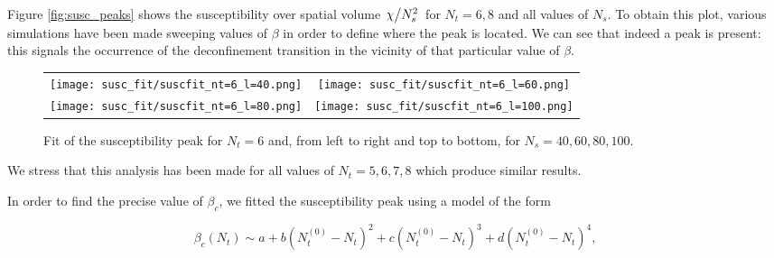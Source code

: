 \documentclass[reqno,12pt]{article}
\numberwithin{equation}{section}
\begin{document}

Figure \ref{fig:susc_peaks} shows the susceptibility over spatial volume 
$\flatfrac{\chi}{N_s^2}$ for $N_t = 6, 8$ and all values of $N_s$. To obtain this plot, various
simulations have been made sweeping values of $\beta$ in order to define where the peak is located. We can see
that indeed a peak is present: this signals the occurrence of the deconfinement transition in the vicinity of that
particular value of $\beta$. 

\begin{figure}[h]
	\centering
	\begin{tabular}{c c}
		\texttt{[image: susc\_fit/suscfit\_nt=6\_l=40.png]} &
		\texttt{[image: susc\_fit/suscfit\_nt=6\_l=60.png]}
		\\
		\texttt{[image: susc\_fit/suscfit\_nt=6\_l=80.png]} &
		\texttt{[image: susc\_fit/suscfit\_nt=6\_l=100.png]}
	\end{tabular}
	\caption[Fit of susceptibility peaks with $N_t = 6$]{Fit of the susceptibility peak for $N_t = 6$ and,
	from left to right and top to bottom, for $N_s = 40, 60, 80, 100$.}
\label{fig:susc_peaks_fit}
\end{figure}

We stress that this analysis has been made for all values
of $N_t = 5, 6, 7, 8$ which produce similar results.

In order to find the precise value of $\beta_c$, we fitted the susceptibility peak
using a model of the form

\begin{equation} \label{eq:quartic_model}
	\beta_c(N_t) \sim a + b(N_t^{(0)} - N_t)^2 + c(N_t^{(0)} - N_t)^3 + d(N_t^{(0)} - N_t)^4,
\end{equation}
\end{document}
